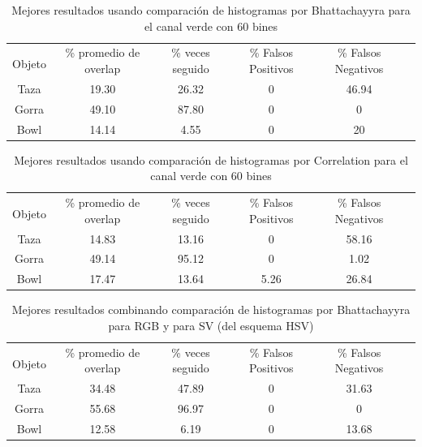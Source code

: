 \begin{table}[h]
	\begin{tabular}{|c|c|c|c|c|c|}
	    \hline
	    & \multirow{2}{2.4cm}{\% promedio de overlap} & \multirow{2}{2cm}{\% veces seguido} & \multirow{2}{1.6cm}{\% Falsos Positivos} & \multirow{2}{1.6cm}{\% Falsos Negativos}\\
		Objeto & & & &\\
	    \hline
	    Taza   & 19.30      & 26.32   & 0       & 46.94 \\
	    \hline
	    Gorra  & 49.10      & 87.80   & 0       & 0     \\
	    \hline
	    Bowl   & 14.14      &  4.55   & 0       & 20    \\
	    \hline
    \end{tabular}
	\caption{Mejores resultados usando comparación de histogramas por Bhattachayyra para el canal verde con 60 bines}
	\label{pruebas_definitivas_bhatta_green}
\end{table}

\begin{table}[h]
	\begin{tabular}{|c|c|c|c|c|c|}
	    \hline
	    & \multirow{2}{2.4cm}{\% promedio de overlap} & \multirow{2}{2cm}{\% veces seguido} & \multirow{2}{1.6cm}{\% Falsos Positivos} & \multirow{2}{1.6cm}{\% Falsos Negativos}\\
		Objeto & & & &\\
	    \hline
	    Taza   & 14.83      & 13.16     & 0      & 58.16 \\
	    \hline
	    Gorra  & 49.14      & 95.12     & 0      & 1.02  \\
	    \hline
	    Bowl   & 17.47      & 13.64     & 5.26   & 26.84 \\
	    \hline
    \end{tabular}
	\caption{Mejores resultados usando comparación de histogramas por Correlation para el canal verde con 60 bines}
	\label{pruebas_definitivas_correl_green}
\end{table}

\begin{table}[h]
	\begin{tabular}{|c|c|c|c|c|c|}
	    \hline
	    & \multirow{2}{2.4cm}{\% promedio de overlap} & \multirow{2}{2cm}{\% veces seguido} & \multirow{2}{1.6cm}{\% Falsos Positivos} & \multirow{2}{1.6cm}{\% Falsos Negativos}\\
		Objeto & & & &\\
	    \hline
	    Taza   & 34.48      & 47.89     & 0        & 31.63  \\
	    \hline
	    Gorra  & 55.68      & 96.97     & 0        & 0      \\
	    \hline
	    Bowl   & 12.58      &  6.19     & 0        & 13.68  \\
	    \hline
    \end{tabular}
	\caption{Mejores resultados combinando comparación de histogramas por Bhattachayyra para RGB y para SV (del esquema HSV)}
	\label{pruebas_definitivas_rgb_sv}
\end{table}



